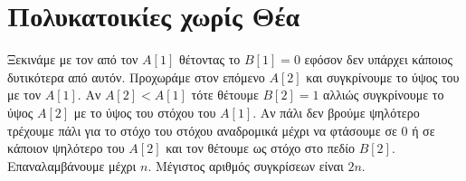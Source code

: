 \documentclass[a4paper,10pt]{article} \usepackage{anysize}
\begin{document}
\section{Πολυκατοικίες χωρίς Θέα}
Ξεκινάμε με τον από τον $A[1]$ θέτοντας το $B[1]=0$ εφόσον δεν υπάρχει κάποιος
δυτικότερα από αυτόν. Προχωράμε στον επόμενο $A[2]$ και συγκρίνουμε το ύψος
του με τον $A[1]$. Αν $A[2]<A[1]$ τότε θέτουμε $B[2]=1$ αλλιώς συγκρίνουμε το
ύψος $A[2]$ με το ύψος του στόχου του $A[1]$. Αν πάλι δεν βρούμε ψηλότερο
τρέχουμε πάλι για το στόχο του στόχου αναδρομικά μέχρι να φτάσουμε σε 0
ή σε κάποιον ψηλότερο του $A[2]$ και τον θέτουμε ως στόχο στο πεδίο $B[2]$.
Επαναλαμβάνουμε μέχρι $n$. Μέγιστος αριθμός συγκρίσεων είναι $2n$.
\end{document}
